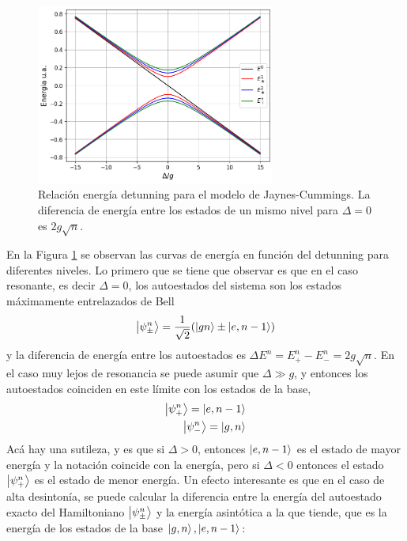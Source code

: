 \begin{figure}
    \centering
    \includegraphics[width=0.7\textwidth]{figuras/ch3/relacion energia detunning jcm simple.png}
    \caption{Relaci\'on energ\'ia detunning para el modelo de Jaynes-Cummings. La diferencia de energ\'ia entre los estados de un mismo nivel para $\Delta=0$ es $2g\sqrt{n}$.}
    \label{fig:relación energia detunning jcm1}
\end{figure}
En la Figura \ref{fig:relación energia detunning jcm1} se observan las curvas de energ\'ia en funci\'on del detunning para diferentes niveles. Lo primero que se tiene que observar es que en el caso resonante, es decir $\Delta=0$, los autoestados del sistema son los estados máximamente entrelazados de Bell
\begin{equation}
    \ket{\psi_\pm^n}=\frac{1}{\sqrt{2}}(\ket{gn}\pm\ket{e,n-1})
\end{equation} 
y la diferencia de energ\'ia entre los autoestados es $\Delta E^n =E^n_+-E^n_-=2g\sqrt{n}$. En el caso muy lejos de resonancia se puede asumir que $\Delta \gg g $, y entonces los autoestados coinciden en este l\'imite con los estados de la base, 
\begin{equation}
    \begin{aligned}
        \ket{\psi^n_+}=\ket{e,n-1} \\
        \ket{\psi^n_-}=\ket{g,n}
    \end{aligned}
\end{equation}
Ac\'a hay una sutileza, y es que si $\Delta>0$, entonces $\ket{e,n-1}$ es el estado de mayor energ\'ia y la notaci\'on coincide con la energ\'ia, pero si $\Delta<0$ entonces el estado $\ket{\psi^n_+}$ es el estado de menor energ\'ia. 
Un efecto interesante es que en el caso de alta desinton\'ia, se puede calcular la diferencia entre la energía del autoestado exacto del Hamiltoniano $\ket{\psi_\pm^n}$ y la energía asintótica a la que tiende, que es la energía de los estados de la base $\ket{g,n},\ket{e,n-1}$:
